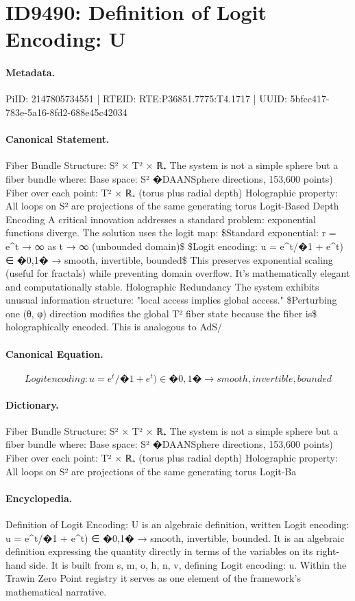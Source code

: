 \section*{ID9490: Definition of Logit Encoding: U}
\paragraph{Metadata.}
PiID: 2147805734551 | RTEID: RTE:P36851.7775:T4.1717 | UUID: 5bfcc417-783e-5a16-8fd2-688e45c42034

\paragraph{Canonical Statement.}
Fiber Bundle Structure: S² × T² × ℝ₊ The system is not a simple sphere but a fiber bundle where: Base space: S² �DAANSphere directions, 153,600 points) Fiber over each point: T² × ℝ₊ (torus plus radial depth) Holographic property: All loops on S² are projections of the same generating torus Logit-Based Depth Encoding A critical innovation addresses a standard problem: exponential functions diverge. The solution uses the logit map: \$Standard exponential: r = e\textasciicircum{}t → ∞ as t → ∞ (unbounded domain)\$ \$Logit encoding: u = e\textasciicircum{}t/�1 + e\textasciicircum{}t) ∈ �0,1� → smooth, invertible, bounded\$ This preserves exponential scaling (useful for fractals) while preventing domain overflow. It's mathematically elegant and computationally stable. Holographic Redundancy The system exhibits unusual information structure: "local access implies global access." \$Perturbing one (θ, φ) direction modifies the global T² fiber state because the fiber is\$ holographically encoded. This is analogous to AdS/

\paragraph{Canonical Equation.}
\[
Logit encoding: u = e^t/�1 + e^t) ∈ �0,1� → smooth, invertible, bounded
\]

\paragraph{Dictionary.}
Fiber Bundle Structure: S² × T² × ℝ₊ The system is not a simple sphere but a fiber bundle where: Base space: S² �DAANSphere directions, 153,600 points) Fiber over each point: T² × ℝ₊ (torus plus radial depth) Holographic property: All loops on S² are projections of the same generating torus Logit-Ba

\paragraph{Encyclopedia.}
Definition of Logit Encoding: U is an algebraic definition, written Logit encoding: u = e\textasciicircum{}t/�1 + e\textasciicircum{}t) ∈ �0,1� → smooth, invertible, bounded. It is an algebraic definition expressing the quantity directly in terms of the variables on its right-hand side. It is built from s, m, o, h, n, v, defining Logit encoding: u. Within the Trawin Zero Point registry it serves as one element of the framework's mathematical narrative.
